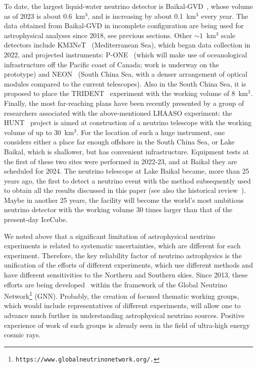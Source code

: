 \documentclass[a4paper,noshowpacs,noshowkeys,floatfix,twocolumn,preprintnumbers,nofootinbib]{revtex4-2}
\begin{document}
To date, the largest liquid-water neutrino detector is Baikal-GVD~\cite{Baikal-GVD}, whose volume as of 2023 is about 0.6~km$^{3}$, and is increasing by about 0.1~km$^{3}$ every year. The data obtained from Baikal-GVD in incomplete configuration are being used for astrophysical analyses since 2018, see previous sections. Other $\sim 1$~km$^{3}$ scale detectors include KM3NeT~\cite{KM3Net}
(Mediterranean Sea), which began data collection in 2022, and projected instruments: P-ONE~\cite{P-ONE} (which will make use of oceanological infrastructure off the Pacific coast of Canada; work is underway on the prototype) and NEON~\cite{NEON-1km3-dense} (South China Sea, with a denser arrangement of optical modules compared to the current telescopes). Also in the South China Sea, it is proposed to place the TRIDENT~\cite{TRIDENT-8km3} experiment with the working volume of 8~km$^{3}$. Finally, the most far-reaching plans have been recently presented by a group of researchers associated with the above-mentioned LHAASO experiment: the HUNT~\cite{HUNT-30km3} project is aimed at construction of a neutrino telescope with the working volume of up to 30~km$^{3}$. For the location of such a huge instrument, one considers either a place far enough offshore in the South China Sea, or Lake Baikal, which is shallower, but has convenient infrastructure. Equipment tests at the first of these two sites were performed in 2022-23, and at Baikal they are scheduled for 2024. The neutrino telescope at Lake Baikal became, more than 25 years ago, the first to detect \cite{Baikal-1st-neutrinos1997,Baikal-1st-neutrinos1999} a neutrino event with the method subsequently used to obtain all the results discussed in this paper (see also the historical review~\cite{Spiering-UFN}). Maybe in another 25 years, the facility will become the world's most ambitious neutrino detector with the working volume 30 times larger than that of the present-day IceCube.

We noted above that a significant limitation of astrophysical neutrino experiments is related to systematic uncertainties, which are different for each experiment. Therefore, the key reliability factor of neutrino astrophysics is the unification of the efforts of different experiments, which use different methods and have different sensitivities to the Northern and Southern skies. Since 2013, these efforts are being developed~\cite{Spiering:2014,Spiering:GNN} within the framework of the Global Neutrino Network\footnote{\tt https://www.globalneutrinonetwork.org/.} (GNN). Probably, the creation of focused thematic working groups, which would include representatives of different experiments, will allow one to advance much further in understanding astrophysical neutrino sources. Positive experience of work of such groups is already seen in the field of ultra-high energy cosmic rays.
\end{document}
